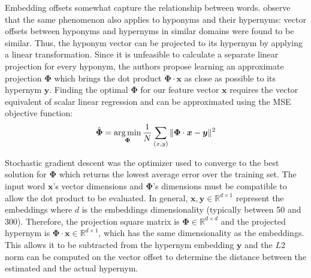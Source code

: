 Embedding offsets somewhat capture the relationship between words.  \citep{Fu2014} observe that the same phenomenon also applies to hyponyms and their hypernyms: vector offsets between hyponyms and hypernyms in similar domains were found to be similar.  Thus, the hyponym vector can be projected to its hypernym by applying a linear transformation.  Since it is unfeasible to calculate a separate linear projection for every hyponym, the authors propose learning an approximate projection $\bm{\Phi}$ which brings the dot product $\bm{\Phi} \cdot \bm{x}$ as close as possible to its hypernym $\bm{y}$.  Finding the optimal $\bm{\Phi}$ for our feature vector $\bm{x}$ requires the vector equivalent of scalar linear regression and can be approximated using the \ac{MSE} objective function:
\[\hat{\bm{\Phi}} = \operatorname*{arg\,min}_{\bm{\Phi}} \frac{1}{N} \sum_{(x,y)} \Vert \bm{\Phi}\cdot\bm{x} - \bm {y} \Vert^2 \]

Stochastic gradient descent was the optimizer used to converge to the best solution for $\bm{\Phi}$ which returns the lowest average error over the training set.  The input word $\bm{x}$’s vector dimensions and $\bm{\Phi}$'s dimensions must be compatible to allow the dot product to be evaluated.  In general, $\bm{x}, \bm{y} \in \mathbb{R}^{d \times 1}$ represent the embeddings where $d$ is the embeddings dimensionality (typically between 50 and 300).  Therefore, the projection square matrix is $\bm{\Phi} \in \mathbb{R}^{d \times d}$ and the projected hypernym is $\bm{\Phi} \cdot \bm{x} \in \mathbb{R}^{d \times 1}$, which has the same dimensionality as the embeddings.  This allows it to be subtracted from the hypernym embedding $\bm{y}$ and the $L2$ norm can be computed on the vector offset to determine the distance between the estimated and the actual hypernym.  

